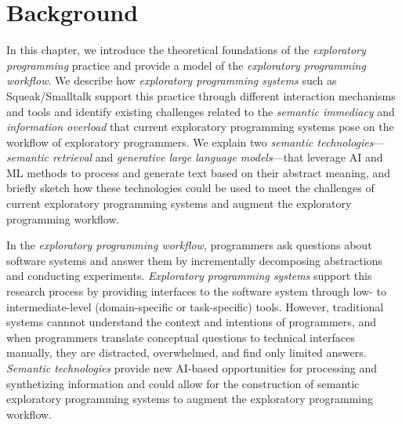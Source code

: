 
\chapter{Background}
\label{cha:background}

In this chapter, we introduce the theoretical foundations of the \emph{exploratory programming} practice and provide a model of the \emph{exploratory programming workflow}.
We describe how \emph{exploratory programming systems} such as Squeak/Smalltalk support this practice through different interaction mechanisms and tools and identify existing challenges related to the \emph{semantic immediacy} and \emph{information overload} that current exploratory programming systems pose on the workflow of exploratory programmers.
We explain two \emph{semantic technologies}---\emph{semantic retrieval} and \emph{generative large language models}---that leverage AI and ML methods to process and generate text based on their abstract meaning, and briefly sketch how these technologies could be used to meet the challenges of current exploratory programming systems and augment the exploratory programming workflow.


\begin{summary}
	In the \emph{exploratory programming workflow}, programmers ask questions about software systems and answer them by incrementally decomposing abstractions and conducting experiments.
	\emph{Exploratory programming systems} support this research process by providing interfaces to the software system through low- to intermediate-level (domain-specific or task-specific) tools.
	However, traditional systems cannnot understand the context and intentions of programmers, and when programmers translate conceptual questions to technical interfaces manually, they are distracted, overwhelmed, and find only limited answers.
	\emph{Semantic technologies} provide new AI-based opportunities for processing and synthetizing information and could allow for the construction of semantic exploratory programming systems to augment the exploratory programming workflow.
\end{summary}
